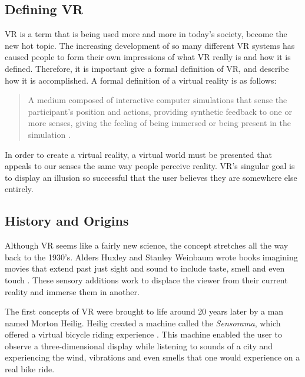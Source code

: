 \documentclass[12pt]{article}
\begin{document}
\subsection{Defining VR}
VR is a term that is being used more and more in today's society, become the new hot topic. The increasing development of so many different VR systems has caused people to form their own impressions of what VR really is and how it is defined. Therefore, it is important give a formal definition of VR, and describe how it is accomplished. A formal definition of a virtual reality is as follows: 

\begin{quote}
A medium composed of interactive computer simulations that sense the participant's position and actions, providing synthetic feedback to one or more senses, giving the feeling of being 
immersed or being present in the simulation \cite{craig}. 
\end{quote}

In order to create a virtual reality, a virtual world must be presented that appeals to our senses the same way people perceive reality. VR's singular goal is to display an illusion so successful that the user believes they are somewhere else entirely. 



\subsection{History and Origins}


Although VR seems like a fairly new science, the concept stretches all the way back to the 1930's. Alders Huxley and Stanley Weinbaum wrote books imagining movies that extend past just sight and sound to include taste, smell and even touch \cite{mihelj}. These sensory additions work to displace the viewer from their current reality and immerse them in another. 

 
\par The first concepts of VR were brought to life around 20 years later by a man named Morton Heilig. Heilig created a machine called the \textit {Sensorama}, which offered a virtual bicycle riding experience \cite{mihelj}. This machine enabled the user to observe a three-dimensional display while listening to sounds of a city and experiencing the wind, vibrations and even smells that one would experience on a real bike ride.
\end{document}
